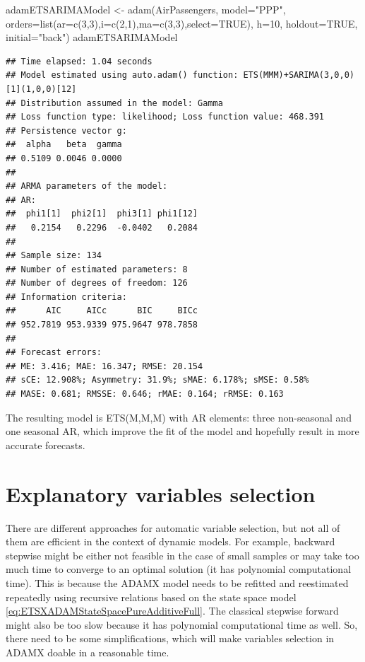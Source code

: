 \documentclass[
]{book}
\newenvironment{Shaded}{\begin{snugshade}}{\end{snugshade}}
\newcommand{\AttributeTok}[1]{\textcolor[rgb]{0.77,0.63,0.00}{#1}}
\newcommand{\ConstantTok}[1]{\textcolor[rgb]{0.00,0.00,0.00}{#1}}
\newcommand{\DecValTok}[1]{\textcolor[rgb]{0.00,0.00,0.81}{#1}}
\newcommand{\FunctionTok}[1]{\textcolor[rgb]{0.00,0.00,0.00}{#1}}
\newcommand{\NormalTok}[1]{#1}
\newcommand{\OtherTok}[1]{\textcolor[rgb]{0.56,0.35,0.01}{#1}}
\newcommand{\StringTok}[1]{\textcolor[rgb]{0.31,0.60,0.02}{#1}}
\theoremstyle{definition}
\theoremstyle{definition}
\theoremstyle{definition}
\theoremstyle{definition}
\theoremstyle{remark}
\begin{document}
\begin{Shaded}
\begin{Highlighting}[]
\NormalTok{adamETSARIMAModel }\OtherTok{\textless{}{-}}
    \FunctionTok{adam}\NormalTok{(AirPassengers, }\AttributeTok{model=}\StringTok{"PPP"}\NormalTok{,}
         \AttributeTok{orders=}\FunctionTok{list}\NormalTok{(}\AttributeTok{ar=}\FunctionTok{c}\NormalTok{(}\DecValTok{3}\NormalTok{,}\DecValTok{3}\NormalTok{),}\AttributeTok{i=}\FunctionTok{c}\NormalTok{(}\DecValTok{2}\NormalTok{,}\DecValTok{1}\NormalTok{),}\AttributeTok{ma=}\FunctionTok{c}\NormalTok{(}\DecValTok{3}\NormalTok{,}\DecValTok{3}\NormalTok{),}\AttributeTok{select=}\ConstantTok{TRUE}\NormalTok{),}
         \AttributeTok{h=}\DecValTok{10}\NormalTok{, }\AttributeTok{holdout=}\ConstantTok{TRUE}\NormalTok{, }\AttributeTok{initial=}\StringTok{"back"}\NormalTok{)}
\NormalTok{adamETSARIMAModel}
\end{Highlighting}
\end{Shaded}

\begin{verbatim}
## Time elapsed: 1.04 seconds
## Model estimated using auto.adam() function: ETS(MMM)+SARIMA(3,0,0)[1](1,0,0)[12]
## Distribution assumed in the model: Gamma
## Loss function type: likelihood; Loss function value: 468.391
## Persistence vector g:
##  alpha   beta  gamma 
## 0.5109 0.0046 0.0000 
## 
## ARMA parameters of the model:
## AR:
##  phi1[1]  phi2[1]  phi3[1] phi1[12] 
##   0.2154   0.2296  -0.0402   0.2084 
## 
## Sample size: 134
## Number of estimated parameters: 8
## Number of degrees of freedom: 126
## Information criteria:
##      AIC     AICc      BIC     BICc 
## 952.7819 953.9339 975.9647 978.7858 
## 
## Forecast errors:
## ME: 3.416; MAE: 16.347; RMSE: 20.154
## sCE: 12.908%; Asymmetry: 31.9%; sMAE: 6.178%; sMSE: 0.58%
## MASE: 0.681; RMSSE: 0.646; rMAE: 0.164; rRMSE: 0.163
\end{verbatim}

The resulting model is ETS(M,M,M) with AR elements: three non-seasonal and one seasonal AR, which improve the fit of the model and hopefully result in more accurate forecasts.

\hypertarget{ETSXSelection}{%
\section{Explanatory variables selection}\label{ETSXSelection}}

There are different approaches for automatic variable selection, but not all of them are efficient in the context of dynamic models. For example, backward stepwise might be either not feasible in the case of small samples or may take too much time to converge to an optimal solution (it has polynomial computational time). This is because the ADAMX model needs to be refitted and reestimated repeatedly using recursive relations based on the state space model \eqref{eq:ETSXADAMStateSpacePureAdditiveFull}. The classical stepwise forward might also be too slow because it has polynomial computational time as well. So, there need to be some simplifications, which will make variables selection in ADAMX doable in a reasonable time.
\end{document}
